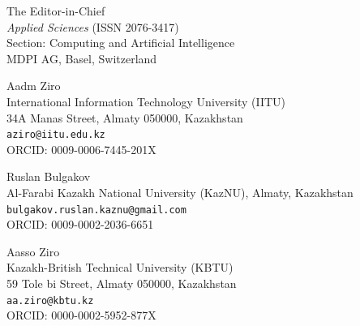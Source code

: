 \documentclass[12pt]{letter}
\begin{document}
\begin{letter}{The Editor-in-Chief \\
\textit{Applied Sciences} (ISSN 2076-3417) \\
Section: Computing and Artificial Intelligence \\
MDPI AG, Basel, Switzerland}
\bigskip

\noindent Aadm Ziro\\
International Information Technology University (IITU)\\
34A Manas Street, Almaty 050000, Kazakhstan\\
\texttt{aziro@iitu.edu.kz}\\
ORCID: 0009-0006-7445-201X

\bigskip

\noindent Ruslan Bulgakov\\
Al-Farabi Kazakh National University (KazNU), Almaty, Kazakhstan\\
\texttt{bulgakov.ruslan.kaznu@gmail.com}\\
ORCID: 0009-0002-2036-6651

\bigskip

\noindent Aasso Ziro\\
Kazakh-British Technical University (KBTU)\\
59 Tole bi Street, Almaty 050000, Kazakhstan\\
\texttt{aa.ziro@kbtu.kz}\\
ORCID: 0000-0002-5952-877X

\end{letter}
\end{document}
